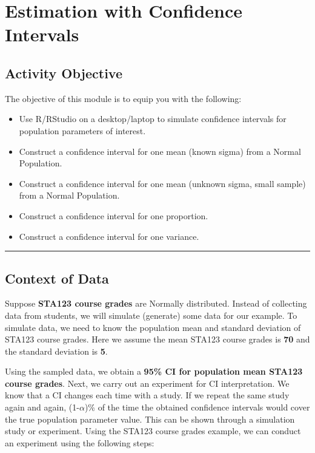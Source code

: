 \documentclass[oneside,openany]{book}
\begin{document}
\chapter{Estimation with Confidence Intervals}\label{activity-5---estimation-with-confidence-intervals}

\section{Activity Objective}\label{activity-objective-2}

The objective of this module is to equip you with the following:
\begin{itemize}
    \item Use R/RStudio on a desktop/laptop to simulate confidence intervals for population parameters of interest.
    \item Construct a confidence interval for one mean (known sigma) from a Normal Population.
    \item Construct a confidence interval for one mean (unknown sigma, small sample) from a Normal Population.
    \item Construct a confidence interval for one proportion.
    \item Construct a confidence interval for one variance.
\end{itemize}


\begin{center}\rule{0.5\linewidth}{0.5pt}\end{center}

\section{Context of Data}\label{context-of-data}

Suppose \textbf{STA123 course grades} are Normally distributed. Instead of collecting data from students, we will simulate (generate) some data for our example. To simulate data, we need to know the population mean and standard deviation of STA123 course grades. Here we assume the mean STA123 course grades is \textbf{70} and the standard deviation is \textbf{5}.

Using the sampled data, we obtain a \textbf{95\% CI for population mean STA123 course grades}. Next, we carry out an experiment for CI interpretation. We know that a CI changes each time with a study. If we repeat the same study again and again, (1-\(\alpha\))\% of the time the obtained confidence intervals would cover the true population parameter value. This can be shown through a simulation study or experiment. Using the STA123 course grades example, we can conduct an experiment using the following steps:
\end{document}
